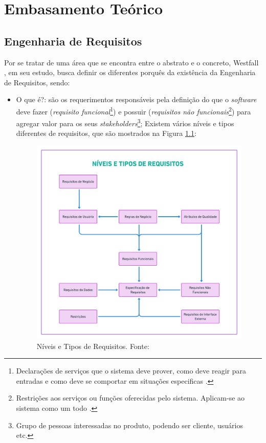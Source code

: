 \chapter[Embasamento Teórico]{Embasamento Teórico}

\section{Engenharia de Requisitos} 

Por se tratar de uma área que se encontra entre o abstrato e o concreto, Westfall \cite{westfall_5w2h}, em seu estudo, busca definir os diferentes porquês da existência da Engenharia de Requisitos, sendo:

\begin{itemize}
    \item O que é?: são os requerimentos responsáveis pela definição do que o \textit{software} deve fazer (\textit{requisito funcional}\footnote{Declarações de serviços que o sistema deve prover, como deve reagir para entradas e como deve se comportar em situações especificas \cite{Sommerville10}.}) e possuir (\textit{requisitos não funcionais}\footnote{Restrições aos serviços ou funções oferecidas pelo sistema. Aplicam-se ao sistema como um todo \cite{Sommerville10}.}) para agregar valor para os seus \textit{stakeholders}\footnote{Grupo de pessoas interessadas no produto, podendo ser cliente, usuários etc.}; Existem vários níveis e tipos diferentes de requisitos, que são mostrados na Figura \ref{lev_tipo_req}:
    
    \begin{figure}[htb]
        \begin{center}
            \includegraphics[width=12cm, height=10cm, keepaspectratio]{figuras/lev_tipo_req.png}
            \caption{{Níveis e Tipos de Requisitos. Fonte: \cite{westfall_5w2h}}}
            \label{lev_tipo_req}
        \end{center}
    \end{figure}
    

\end{itemize}
